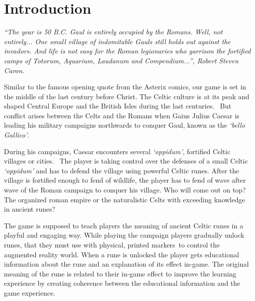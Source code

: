 \section{Introduction}
\label{sec:introduction}

\textit{``The year is 50 B.C. Gaul is entirely occupied by the Romans. Well, not entirely... One small village of indomitable Gauls still holds out against the invadors. And life is not easy for the Roman legionaries who garrison the fortified camps of Totorum, Aquarium, Laudanum and Compendium...'', Robert Steven Caron.}~\cite{asterix-beginning}

Similar to the famous opening quote from the Asterix comics, our game is set in the middle of the last century before Christ. The Celtic culture is at its peak and shaped Central Europe and the British Isles during the last centuries.~\cite{celtic-expansion} But conflict arises between the Celts and the Romans when Gaius Julius Caesar is leading his military campaigns northwards to conquer Gaul, known as the \textit{`bello Gallico'}.\footnotemark
{}

During his campaigns, Caesar encounters several \textit{`oppidum'}, fortified Celtic villages or cities.~\cite{collis-oppidum} The player is taking control over the defenses of a small Celtic \textit{`oppidum'} and has to defend the village using powerful Celtic runes. After the village is fortified enough to fend of wildlife, the player has to fend of wave after wave of the Roman campaign to conquer his village. Who will come out on top? The organized roman empire or the naturalistic Celts with exceeding knowledge in ancient runes?

The game is supposed to teach players the meaning of ancient Celtic runes in a playful and engaging way. While playing the campaign players gradually unlock runes, that they must use with physical, printed markers\footnotemark \ to control the augmented reality world.
When a rune is unlocked the player gets educational information about the rune and an explanation of its effect in-game. The original meaning of the rune is related to their in-game effect to improve the learning experience by creating coherence between the educational information and the game experience.

